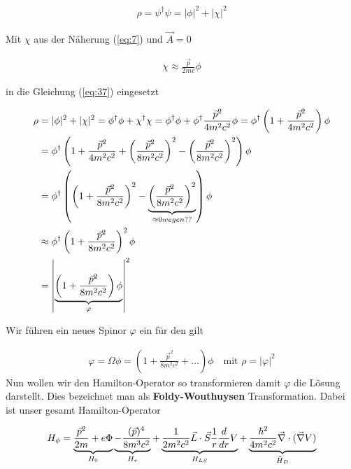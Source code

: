 \begin{align}
  \label{eq:37}
  \rho = \psi^\dagger\psi = |\phi|^2+|\chi|^2
\end{align}

Mit \(\chi\) aus der Näherung (\ref{eq:7}) und \(\vec A=0\)

\begin{align}
  \label{eq:38}
   \chi \approx \frac{\vec p}{2mc}\phi
\end{align}

in die Gleichung (\ref{eq:37}) eingesetzt

\begin{align}
  \label{eq:39}
  \rho &= |\phi|^2+|\chi|^2  = \phi^\dagger\phi + \chi^\dagger\chi =  \phi^\dagger\phi + \phi^\dagger \frac{\vec p^2}{4m^2c^2}\phi = \phi^\dagger\left(1 + \frac{\vec p^2}{4m^2c^2} \right) \phi\notag\\
&= \phi^\dagger\left(1 + \frac{\vec p^2}{4m^2c^2} + \left(\frac{\vec p^2}{8m^2c^2}\right)^2 -\left(\frac{\vec p^2}{8m^2c^2}\right)^2   \right) \phi\notag\\
&= \phi^\dagger\left( \left(1 + \frac{\vec p^2}{8m^2c^2}\right)^2 -\underbr{\left(\frac{\vec p^2}{8m^2c^2}\right)^2}_{\approx 0 wegen ??}   \right) \phi\notag\\
&\approx \phi^\dagger \left(1 + \frac{\vec p^2}{8m^2c^2}\right)^2 \phi\notag\\
&= \left| \underbr{\left(1 + \frac{\vec p^2}{8m^2c^2}\right) \phi}_{\varphi} \right|^2
\end{align}


Wir führen ein neues Spinor \(\varphi\) ein für den gilt

\begin{align}
  \label{eq:40}
  \varphi = \Omega\phi = \left(1 + \frac{\vec p^2}{8m^2c^2} + \dots \right) \phi \quad\text{mit }\rho = |\varphi|^2
\end{align}
Nun wollen wir den Hamilton-Operator so transformieren damit \(\varphi\) die Lösung darstellt. Dies bezeichnet man als \textbf{Foldy-Wouthuysen} Transformation. Dabei ist unser gesamt Hamilton-Operator

\begin{align}
  \label{eq:42}
  H_\phi = \underbr{\frac{\vec p^2}{2m}  +e\Phi}_{H_0}\underbr{ - \frac{(\vec p)^4 }{8m^3c^2}}_{H_r}+\underbr{ \frac{1 }{2m^2c^2}\vec L\cdot\vec S \frac{1}{r}\frac{d}{dr}V}_{H_{LS}} + \underbr{\frac{\hbar^2 }{4m^2c^2}\vec \nabla\cdot(\vec\nabla V)}_{\tilde H_D}
\end{align}

